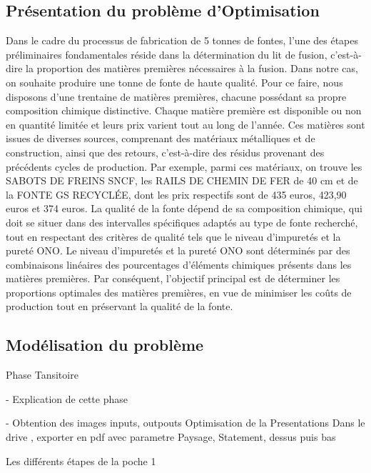 \documentclass[12pt]{article}
\begin{document}
\subsection{Présentation du problème d'Optimisation }

Dans le cadre du processus de fabrication de 5 tonnes de fontes, l'une des étapes préliminaires fondamentales
réside dans la détermination du lit de fusion, c'est-à-dire la proportion des matières premières
nécessaires à la fusion. Dans notre cas, on souhaite  produire une tonne de fonte de haute qualité.
Pour ce faire, nous disposons d'une trentaine de matières premières, chacune possédant sa propre
composition chimique distinctive. Chaque matière première est disponible ou non en quantité limitée
et leurs prix varient tout au long de l'année. Ces matières sont issues de diverses sources,
comprenant des matériaux métalliques et de construction, ainsi que des retours, c'est-à-dire
des résidus provenant des précédents cycles de production. Par exemple, parmi ces matériaux,
on trouve les SABOTS DE FREINS SNCF, les RAILS DE CHEMIN DE FER de 40 cm et de la FONTE GS RECYCLÉE,
dont les prix respectifs sont de 435 euros, 423,90 euros et 374 euros. La qualité de la fonte dépend
de sa composition chimique, qui doit se situer dans des intervalles spécifiques adaptés au type
de fonte recherché, tout en respectant des critères de qualité tels que le niveau d'impuretés et
la pureté ONO. Le niveau d'impuretés et la pureté ONO sont déterminés par des combinaisons linéaires
des pourcentages d'éléments chimiques présents dans les matières premières. Par conséquent,
l'objectif principal est de déterminer les proportions optimales des matières premières,
en vue de minimiser les coûts de production tout en préservant la qualité de la fonte.


\subsection{Modélisation du problème}



Phase Tansitoire 

- Explication de cette phase 


- Obtention des images inputs, outpouts Optimisation de la Presentations
Dans le drive , exporter en pdf avec parametre Paysage, Statement, dessus puis bas


Les différents étapes  de la poche 1
\end{document}
